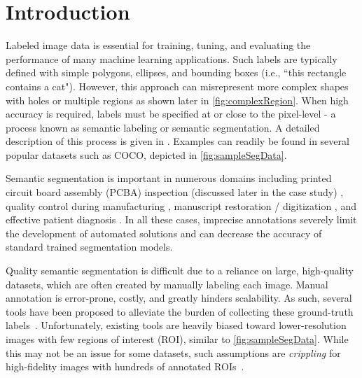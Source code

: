 \section{Introduction}
Labeled image data is essential for training, tuning, and evaluating the performance of many machine learning applications.
Such labels are typically defined with simple polygons, ellipses, and bounding boxes (i.e., ``this rectangle contains a cat").
However, this approach can misrepresent more complex shapes with holes or multiple regions as shown later in \autoref{fig:complexRegion}.
When high accuracy is required, labels must be specified at or close to the pixel-level - a process known as semantic labeling or semantic segmentation.
A detailed description of this process is given in \cite{chengSurveyAnalysisAutomatic2018}.
Examples can readily be found in several popular datasets such as COCO, depicted in \autoref{fig:sampleSegData}.

\makeSampleSegFig

Semantic segmentation is important in numerous domains including printed circuit board assembly (PCBA) inspection (discussed later in the case study) \cite{paradis2020color,azhaganReviewAutomaticBill2019}, quality control during manufacturing \cite{fergusonDetectionSegmentationManufacturing2018,anagnostopoulosComputerVisionApproach2001,anagnostopoulosHighPerformanceComputing2002}, manuscript restoration / digitization \cite{gatosSegmentationfreeRecognitionTechnique2004,kesimanNewSchemeText2016,jainTextSegmentationUsing1992,taxtSegmentationDocumentImages1989,fujisawaSegmentationMethodsCharacter1992}, and effective patient diagnosis \cite{seifertSemanticAnnotationMedical2010,rajchlDeepCutObjectSegmentation2017,yushkevichUserguided3DActive2006,iakovidisRatsnakeVersatileImage2014}.
In all these cases, imprecise annotations severely limit the development of automated solutions and can decrease the accuracy of standard trained segmentation models.

Quality semantic segmentation is difficult due to a reliance on large, high-quality datasets, which are often created by manually labeling each image.
Manual annotation is error-prone, costly, and greatly hinders scalability.
As such, several tools have been proposed to alleviate the burden of collecting these ground-truth labels~\cite{BestImageAnnotation}.
Unfortunately, existing tools are heavily biased toward lower-resolution images with few regions of interest (ROI), similar to \autoref{fig:sampleSegData}.
While this may not be an issue for some datasets, such assumptions are \emph{crippling} for high-fidelity images with hundreds of annotated ROIs~\cite{Ladicky_whatWhereCombiningCRFs,Wang_multiLabelImageAnnotation}.

